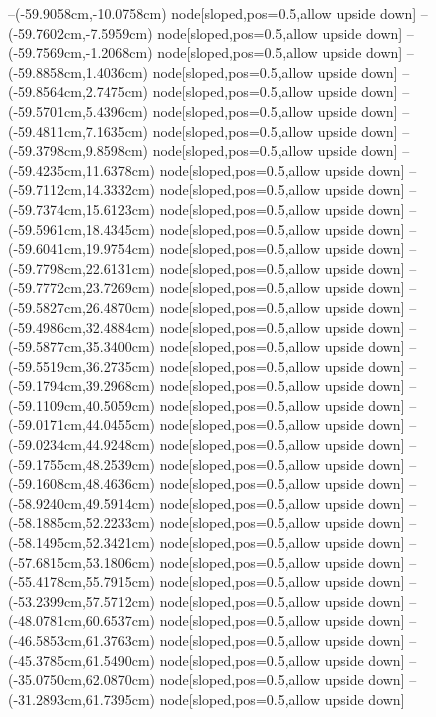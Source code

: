 --(-59.9058cm,-10.0758cm) node[sloped,pos=0.5,allow upside down]{\ArrowIn}
--(-59.7602cm,-7.5959cm) node[sloped,pos=0.5,allow upside down]{\ArrowIn}
--(-59.7569cm,-1.2068cm) node[sloped,pos=0.5,allow upside down]{\ArrowIn}
--(-59.8858cm,1.4036cm) node[sloped,pos=0.5,allow upside down]{\ArrowIn}
--(-59.8564cm,2.7475cm) node[sloped,pos=0.5,allow upside down]{\ArrowIn}
--(-59.5701cm,5.4396cm) node[sloped,pos=0.5,allow upside down]{\ArrowIn}
--(-59.4811cm,7.1635cm) node[sloped,pos=0.5,allow upside down]{\ArrowIn}
--(-59.3798cm,9.8598cm) node[sloped,pos=0.5,allow upside down]{\ArrowIn}
--(-59.4235cm,11.6378cm) node[sloped,pos=0.5,allow upside down]{\ArrowIn}
--(-59.7112cm,14.3332cm) node[sloped,pos=0.5,allow upside down]{\ArrowIn}
--(-59.7374cm,15.6123cm) node[sloped,pos=0.5,allow upside down]{\ArrowIn}
--(-59.5961cm,18.4345cm) node[sloped,pos=0.5,allow upside down]{\ArrowIn}
--(-59.6041cm,19.9754cm) node[sloped,pos=0.5,allow upside down]{\ArrowIn}
--(-59.7798cm,22.6131cm) node[sloped,pos=0.5,allow upside down]{\ArrowIn}
--(-59.7772cm,23.7269cm) node[sloped,pos=0.5,allow upside down]{\ArrowIn}
--(-59.5827cm,26.4870cm) node[sloped,pos=0.5,allow upside down]{\ArrowIn}
--(-59.4986cm,32.4884cm) node[sloped,pos=0.5,allow upside down]{\ArrowIn}
--(-59.5877cm,35.3400cm) node[sloped,pos=0.5,allow upside down]{\ArrowIn}
--(-59.5519cm,36.2735cm) node[sloped,pos=0.5,allow upside down]{\arrowIn}
--(-59.1794cm,39.2968cm) node[sloped,pos=0.5,allow upside down]{\ArrowIn}
--(-59.1109cm,40.5059cm) node[sloped,pos=0.5,allow upside down]{\ArrowIn}
--(-59.0171cm,44.0455cm) node[sloped,pos=0.5,allow upside down]{\ArrowIn}
--(-59.0234cm,44.9248cm) node[sloped,pos=0.5,allow upside down]{\arrowIn}
--(-59.1755cm,48.2539cm) node[sloped,pos=0.5,allow upside down]{\ArrowIn}
--(-59.1608cm,48.4636cm) node[sloped,pos=0.5,allow upside down]{\arrowIn}
--(-58.9240cm,49.5914cm) node[sloped,pos=0.5,allow upside down]{\ArrowIn}
--(-58.1885cm,52.2233cm) node[sloped,pos=0.5,allow upside down]{\ArrowIn}
--(-58.1495cm,52.3421cm) node[sloped,pos=0.5,allow upside down]{\arrowIn}
--(-57.6815cm,53.1806cm) node[sloped,pos=0.5,allow upside down]{\arrowIn}
--(-55.4178cm,55.7915cm) node[sloped,pos=0.5,allow upside down]{\ArrowIn}
--(-53.2399cm,57.5712cm) node[sloped,pos=0.5,allow upside down]{\ArrowIn}
--(-48.0781cm,60.6537cm) node[sloped,pos=0.5,allow upside down]{\ArrowIn}
--(-46.5853cm,61.3763cm) node[sloped,pos=0.5,allow upside down]{\ArrowIn}
--(-45.3785cm,61.5490cm) node[sloped,pos=0.5,allow upside down]{\ArrowIn}
--(-35.0750cm,62.0870cm) node[sloped,pos=0.5,allow upside down]{\ArrowIn}
--(-31.2893cm,61.7395cm) node[sloped,pos=0.5,allow upside down]{\ArrowIn}
